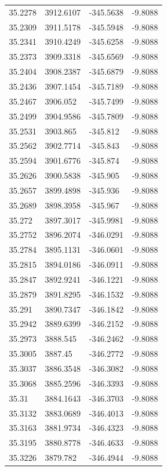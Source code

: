 \begin{table}[H]
\begin{tabular}{llll}
35.2278 & 3912.6107 & -345.5638 & -9.8088 \\
35.2309 & 3911.5178 & -345.5948 & -9.8088 \\
35.2341 & 3910.4249 & -345.6258 & -9.8088 \\
35.2373 & 3909.3318 & -345.6569 & -9.8088 \\
35.2404 & 3908.2387 & -345.6879 & -9.8088 \\
35.2436 & 3907.1454 & -345.7189 & -9.8088 \\
35.2467 & 3906.052 & -345.7499 & -9.8088 \\
35.2499 & 3904.9586 & -345.7809 & -9.8088 \\
35.2531 & 3903.865 & -345.812 & -9.8088 \\
35.2562 & 3902.7714 & -345.843 & -9.8088 \\
35.2594 & 3901.6776 & -345.874 & -9.8088 \\
35.2626 & 3900.5838 & -345.905 & -9.8088 \\
35.2657 & 3899.4898 & -345.936 & -9.8088 \\
35.2689 & 3898.3958 & -345.967 & -9.8088 \\
35.272 & 3897.3017 & -345.9981 & -9.8088 \\
35.2752 & 3896.2074 & -346.0291 & -9.8088 \\
35.2784 & 3895.1131 & -346.0601 & -9.8088 \\
35.2815 & 3894.0186 & -346.0911 & -9.8088 \\
35.2847 & 3892.9241 & -346.1221 & -9.8088 \\
35.2879 & 3891.8295 & -346.1532 & -9.8088 \\
35.291 & 3890.7347 & -346.1842 & -9.8088 \\
35.2942 & 3889.6399 & -346.2152 & -9.8088 \\
35.2973 & 3888.545 & -346.2462 & -9.8088 \\
35.3005 & 3887.45 & -346.2772 & -9.8088 \\
35.3037 & 3886.3548 & -346.3082 & -9.8088 \\
35.3068 & 3885.2596 & -346.3393 & -9.8088 \\
35.31 & 3884.1643 & -346.3703 & -9.8088 \\
35.3132 & 3883.0689 & -346.4013 & -9.8088 \\
35.3163 & 3881.9734 & -346.4323 & -9.8088 \\
35.3195 & 3880.8778 & -346.4633 & -9.8088 \\
35.3226 & 3879.782 & -346.4944 & -9.8088 \\

\end{tabular}
\end{table}
